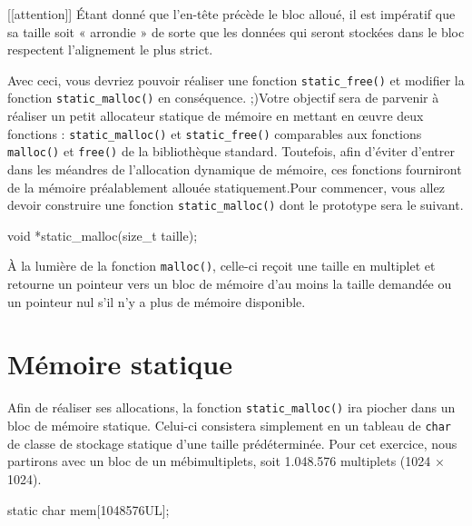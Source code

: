 \documentclass[]{article}
\newenvironment{Shaded}{}{}
\newcommand{\DataTypeTok}[1]{\textcolor[rgb]{0.56,0.13,0.00}{{#1}}}
\newcommand{\NormalTok}[1]{{#1}}
\begin{document}
{[}{[}attention{]}{]} \textbar{} Étant donné que l'en-tête précède le
bloc alloué, il est impératif que sa taille soit « arrondie » de sorte
que les données qui seront stockées dans le bloc respectent l'alignement
le plus strict.

Avec ceci, vous devriez pouvoir réaliser une fonction
\texttt{static\_free()} et modifier la fonction
\texttt{static\_malloc()} en conséquence. ;)Votre objectif sera de
parvenir à réaliser un petit allocateur statique de mémoire en mettant
en œuvre deux fonctions : \texttt{static\_malloc()} et
\texttt{static\_free()} comparables aux fonctions \texttt{malloc()} et
\texttt{free()} de la bibliothèque standard. Toutefois, afin d'éviter
d'entrer dans les méandres de l'allocation dynamique de mémoire, ces
fonctions fourniront de la mémoire préalablement allouée
statiquement.Pour commencer, vous allez devoir construire une fonction
\texttt{static\_malloc()} dont le prototype sera le suivant.

\begin{Shaded}
\begin{Highlighting}[]
\DataTypeTok{void} \NormalTok{*static_malloc(}\DataTypeTok{size_t} \NormalTok{taille);}
\end{Highlighting}
\end{Shaded}

À la lumière de la fonction \texttt{malloc()}, celle-ci reçoit une
taille en multiplet et retourne un pointeur vers un bloc de mémoire d'au
moins la taille demandée ou un pointeur nul s'il n'y a plus de mémoire
disponible.

\section{Mémoire statique}\label{muxe9moire-statique}

Afin de réaliser ses allocations, la fonction \texttt{static\_malloc()}
ira piocher dans un bloc de mémoire statique. Celui-ci consistera
simplement en un tableau de \texttt{char} de classe de stockage statique
d'une taille prédéterminée. Pour cet exercice, nous partirons avec un
bloc de un mébimultiplets, soit 1.048.576 multiplets (1024 × 1024).

\begin{Shaded}
\begin{Highlighting}[]
\DataTypeTok{static} \DataTypeTok{char} \NormalTok{mem[1048576UL];}
\end{Highlighting}
\end{Shaded}
\end{document}
